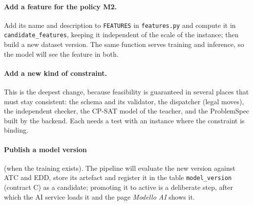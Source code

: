 \paragraph{Add a feature for the policy M2.} Add its name and description to \texttt{FEATURES} in
\texttt{features.py} and compute it in \texttt{candidate\_features}, keeping it independent of the
scale of the instance; then build a new dataset version. The same function serves training and
inference, so the model will see the feature in both.

\paragraph{Add a new kind of constraint.} This is the deepest change, because feasibility is
guaranteed in several places that must stay consistent: the schema and its validator, the
dispatcher (legal moves), the independent checker, the CP-SAT model of the teacher, and the
ProblemSpec built by the backend. Each needs a test with an instance where the constraint is
binding.

\paragraph{Publish a model version} (when the training exists). The pipeline will evaluate the
new version against ATC and EDD, store its artefact and register it in the table
\texttt{model\_version} (contract C) as a candidate; promoting it to active is a deliberate step,
after which the AI service loads it and the page \emph{Modello AI} shows it.
\fussy
